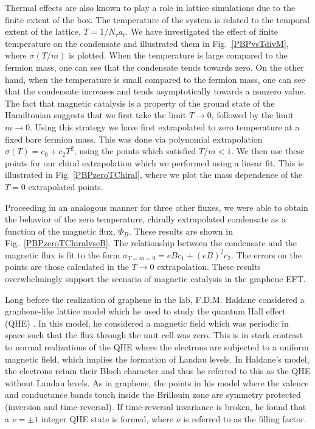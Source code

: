 \documentclass[aps,prd,twocolumn,showpacs,superscriptaddress,groupedaddress]{revtex4}  %
\begin{document}
Thermal effects are also known to play a role in lattice simulations due to the finite extent of the box. The temperature of the system is related to the temporal extent of the lattice, $T = 1/N_{\tau}a_t$. We have investigated the effect of finite temperature on the condensate and illustrated them in Fig.~\ref{PBPvsTdivM}, where $\sigma(T/m)$ is plotted. When the temperature is large 
compared to the fermion mass, one can see that the condensate tends towards zero. On the other hand, when the temperature is small compared to the fermion mass, one can see that the condensate increases and tends asymptotically towards a nonzero value. The fact that magnetic catalysis is a property of the ground state of the Hamiltonian suggests that we first take the limit $T \to 0$, followed
by the limit $m \to 0$. Using this strategy we have first extrapolated to zero temperature at a fixed bare fermion mass. This was done via polynomial extrapolation $\sigma(T) = c_0 + c_2T^2$, using the points which satisfied $T/m < 1$. We then use these points for our chiral extrapolation which we performed using a linear fit. This is illustrated in Fig. \ref{PBPzeroTChiral}, where we plot the mass dependence of the $T=0$ extrapolated points.

Proceeding in an analogous manner for three other fluxes, we were able to obtain the behavior of the zero temperature, chirally extrapolated condensate as a function of the magnetic flux, $\Phi_B$. These results are shown in Fig.~\ref{PBPzeroTChiralvseB}.
The relationship between the condensate and the magnetic flux is fit to the form $\sigma_{T=m=0} = eBc_1 + (eB)^2c_2$. The errors on the points are those calculated in the $T \to 0$ extrapolation. These results overwhelmingly support the scenario of magnetic catalysis in the graphene EFT.

Long before the realization of graphene in the lab, F.D.M. Haldane considered a graphene-like lattice model which he used to study the quantum Hall effect (QHE) \cite{Haldane}.
In this model, he considered a magnetic field which was periodic in space such that the flux through the unit cell was zero. This is in stark contrast to normal realizations of the QHE 
where the electrons are subjected to a uniform magnetic field, which implies the formation of Landau levels. In Haldane's model, the electrons retain their Bloch character and thus he referred to 
this as the QHE without Landau levels. As in graphene, the points in his model where the valence and conductance bands touch inside the Brillouin zone are symmetry protected (inversion and time-reversal).
If time-reversal invariance is broken, he found that a $\nu = \pm 1$ integer QHE state is formed, where $\nu$ is referred to as the filling factor. 
\end{document}
